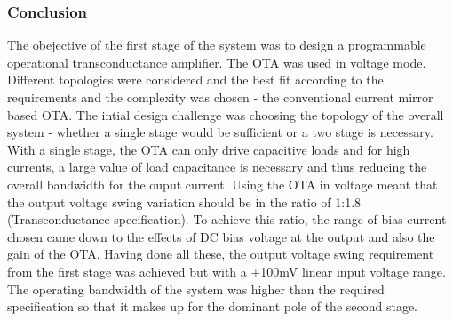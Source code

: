 \subsubsection{Conclusion}
The obejective of the first stage of the system was to design a programmable operational transconductance amplifier. The OTA was used in voltage mode. Different topologies were considered and the best fit according to the requirements and the complexity was chosen - the conventional current mirror based OTA. The intial design challenge was choosing the topology of the overall system - whether a single stage would be sufficient or a two stage is necessary. With a single stage, the OTA can only drive capacitive loads and for high currents, a large value of load capacitance is necessary and thus reducing the overall bandwidth for the ouput current. Using the OTA in voltage meant that the output voltage swing variation should be in the ratio of 1:1.8 (Transconductance specification). To achieve this ratio, the range of bias current chosen came down to the effects of DC bias voltage at the output and also the gain of the OTA. Having done all these, the output voltage swing requirement from the first stage was achieved but with a $\pm$100mV linear input voltage range. The operating bandwidth of the system was higher than the required specification so that it makes up for the dominant pole of the second stage.